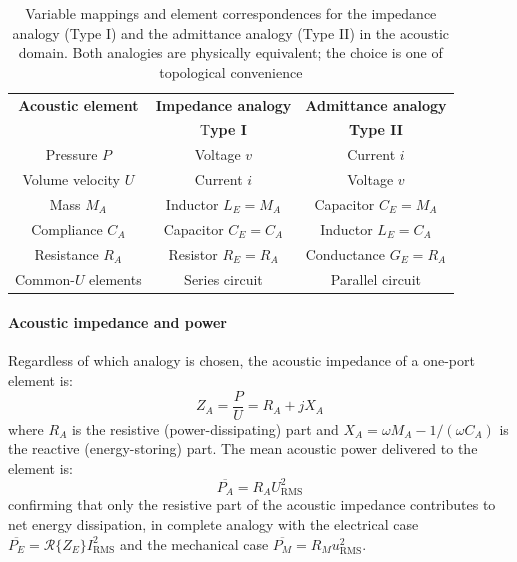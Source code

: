 \begin{table}[!htb]
\centering
\renewcommand{\arraystretch}{1.3}
\begin{tabular}{|c|c|c|}
\hline
\textbf{Acoustic element} & \textbf{Impedance analogy} & \textbf{Admittance analogy} \\
                          & T\textbf{ype I}            & \textbf{Type II} \\
\hline
Pressure \(P\)       & Voltage \(v\) & Current \(i\) \\
Volume velocity \(U\) & Current \(i\) & Voltage \(v\) \\
\hline
Mass \(M_A\)        & Inductor \(L_E = M_A\)          & Capacitor \(C_E = M_A\) \\
Compliance \(C_A\)  & Capacitor \(C_E = C_A\)          & Inductor \(L_E = C_A\)  \\
Resistance \(R_A\)  & Resistor \(R_E = R_A\)           & Conductance \(G_E = R_A\) \\
\hline
Common-\(U\) elements & Series circuit & Parallel circuit \\
\hline
\end{tabular}
\caption{Variable mappings and element correspondences for the impedance analogy
(Type I) and the admittance analogy (Type II) in the acoustic domain. Both
analogies are physically equivalent; the choice is one of topological
convenience}
\label{tab:acousticAnalogies}
\end{table}

\paragraph{Acoustic impedance and power} Regardless of which analogy is chosen,
the acoustic impedance of a one-port element is:
\[
Z_A = \frac{P}{U} = R_A + jX_A
\]
where \(R_A\) is the resistive (power-dissipating) part and \(X_A = \omega M_A - 1/(\omega C_A)\) is the reactive (energy-storing) part. The mean acoustic power delivered to the element is:
\[
\overline{P_A} = R_A U_{\mathrm{RMS}}^2
\]
confirming that only the resistive part of the acoustic impedance contributes to net energy dissipation, in complete analogy with the electrical case \(\overline{P_E} = \mathcal{R}\{Z_E\} I_{\mathrm{RMS}}^2\) and the mechanical case \(\overline{P_M} = R_M u_{\mathrm{RMS}}^2\).
